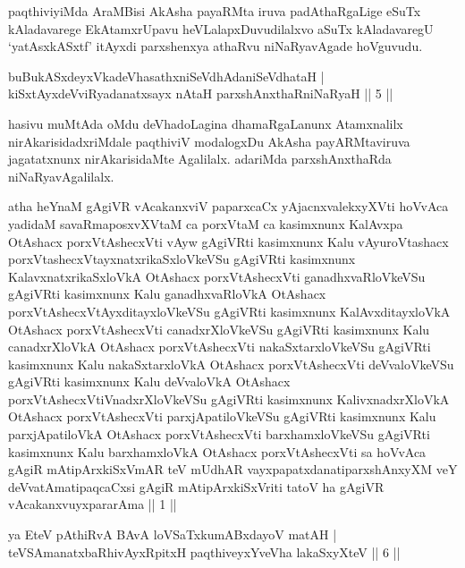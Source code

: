 \begin{artha}
paqthiviyiMda AraMBisi AkAsha payaRMta iruva padAthaRgaLige eSuTx kAladavarege EkAtamxrUpavu heVLalapxDuvudilalxvo aSuTx kAladavaregU `yatAsxkASxtf' itAyxdi parxshenxya athaRvu niNaRyavAgade hoVguvudu.
\end{artha}

\begin{shl}
buBukASxdeyxVkadeVhasathxniSeVdhAdaniSeVdhataH |\\
kiSxtAyxdeVviRyadanatxsayx nAtaH parxshAnxthaRniNaRyaH \hfill || 5 ||
\end{shl}

\begin{artha}%
hasivu muMtAda oMdu deVhadoLagina dhamaRgaLanunx Atamxnalilx nirAkarisidadxriMdale paqthiviV modalogxDu AkAsha payARMtaviruva jagatatxnunx nirAkarisidaMte Agalilalx. adariMda parxshAnxthaRda niNaRyavAgalilalx.
\end{artha}


\begin{kandikeshl}
atha heYnaM gAgiVR vAcakanxviV paparxcaCx yAjacnxvalekxyXVti hoVvAca yadidaM savaRmaposxvXVtaM ca porxVtaM ca kasimxnunx KalAvxpa OtAshacx porxVtAshecxVti vAyw gAgiVRti kasimxnunx Kalu vAyuroVtashacx porxVtashecxVtayxnatxrikaSxloVkeVSu gAgiVRti kasimxnunx KalavxnatxrikaSxloVkA OtAshacx porxVtAshecxVti ganadhxvaRloVkeVSu gAgiVRti kasimxnunx Kalu ganadhxvaRloVkA OtAshacx porxVtAshecxVtAyxditayxloVkeVSu gAgiVRti kasimxnunx KalAvxditayxloVkA OtAshacx porxVtAshecxVti canadxrXloVkeVSu gAgiVRti kasimxnunx Kalu canadxrXloVkA OtAshacx porxVtAshecxVti nakaSxtarxloVkeVSu gAgiVRti kasimxnunx Kalu nakaSxtarxloVkA OtAshacx porxVtAshecxVti deVvaloVkeVSu gAgiVRti kasimxnunx Kalu deVvaloVkA OtAshacx porxVtAshecxVtiVnadxrXloVkeVSu gAgiVRti kasimxnunx KalivxnadxrXloVkA OtAshacx porxVtAshecxVti parxjApatiloVkeVSu gAgiVRti kasimxnunx Kalu parxjApatiloVkA OtAshacx porxVtAshecxVti barxhamxloVkeVSu gAgiVRti kasimxnunx Kalu barxhamxloVkA OtAshacx porxVtAshecxVti sa hoVvAca gAgiR mAtipArxkiSxVmAR teV mUdhAR vayxpapatxdanatiparxshAnxyXM veY deVvatAmatipaqcaCxsi gAgiR mAtipArxkiSxVriti tatoV ha gAgiVR vAcakanxvuyxpararAma || 1 ||
\end{kandikeshl}


\begin{shl}
ya EteV pAthiRvA BAvA loVSaTxkumABxdayoV matAH |\\
teVSAmanatxbaRhivAyxRpitxH paqthiveyxYveVha lakaSxyXteV \hfill || 6 ||
\end{shl}

